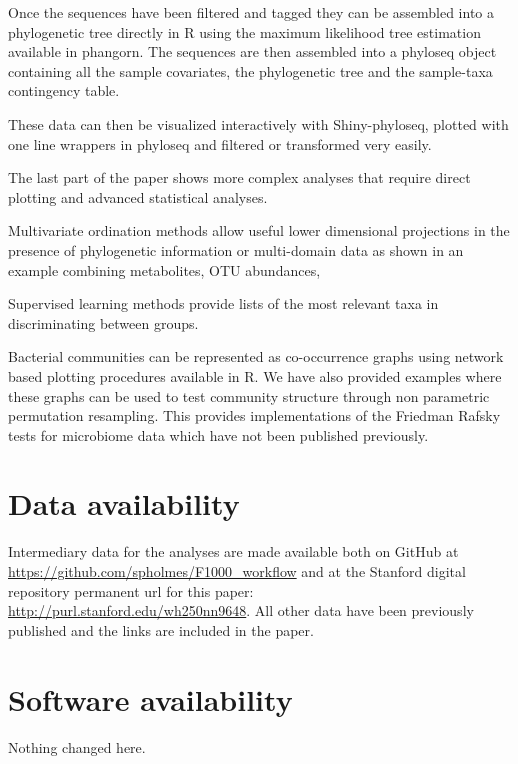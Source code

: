 \documentclass[9pt,a4paper]{extarticle}\usepackage[]{graphicx}\usepackage[]{color}
\makeatletter
\newcommand{\pkgname}[1]{\textit{#1}\xspace}
\newcommand{\CRANurl}[1]{\url{http://cran.r-project.org/package=#1}}
\def\CRANpkg{\@ifstar\@CRANpkg\@@CRANpkg}
\def\@CRANpkg#1{\href{http://cran.r-project.org/package=#1}{\pkgname{#1}}}
\def\@@CRANpkg#1{\href{http://cran.r-project.org/package=#1}{\pkgname{#1}}} %
\makeatother
\begin{document}
Once the sequences have been filtered and tagged they can be assembled into a phylogenetic tree directly
in R using the maximum likelihood tree estimation available in \CRANpkg{phangorn}.
The sequences are then assembled into a phyloseq object containing all the sample covariates,
the phylogenetic tree and the sample-taxa contingency table.

These data can then be visualized interactively with Shiny-phyloseq, plotted with one line
wrappers in phyloseq and filtered or transformed very easily.

The last part of the paper shows more complex analyses that require direct plotting and advanced statistical analyses.



Multivariate ordination methods allow useful lower dimensional projections in the presence of phylogenetic
information or multi-domain data as shown in an example combining metabolites, OTU abundances,

Supervised learning methods provide lists of the most relevant taxa in
discriminating between groups.

Bacterial communities can be represented as co-occurrence graphs
using network based plotting procedures available in R. We have also
provided examples where these graphs can be used to test
community structure through non parametric permutation resampling.
This provides implementations of the Friedman Rafsky\cite{friedman1979multivariate} tests for microbiome data
which have not been published previously.







\section*{Data availability} %
Intermediary data for the analyses are made available
both on GitHub at
\url{https://github.com/spholmes/F1000_workflow}
and 
at the Stanford
digital repository permanent url for this paper: \\
\url{http://purl.stanford.edu/wh250nn9648}.
All other data have been previously published and the links are included in
the paper.


\section*{Software availability}
Nothing changed here.
\end{document}
